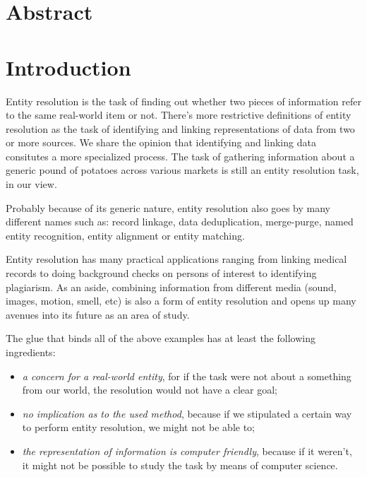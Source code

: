 \documentclass[11pt]{article}
\begin{document}
    \theoremstyle{definition}
    \newtheorem{defn}{Definition}[section]
    
    \section{Abstract}\label{sec:abstract}


    \section{Introduction}\label{sec:introduction}
    Entity resolution is the task of finding out whether two pieces of
    information refer to the same real-world item or not.
    There's more restrictive definitions of entity resolution as the task of
    identifying and linking representations of data from two or more
    sources\cite{Qia17}.
    We share the opinion that identifying and linking data consitutes a more
    specialized process\cite{Tal11}.
    The task of gathering information about a generic pound of potatoes across
    various markets is still an entity resolution task, in our view.
    
    Probably because of its generic nature, entity resolution also goes by many
    different names such as: record linkage, data deduplication, merge-purge,
    named entity recognition, entity alignment or entity
    matching\cite{Tal11,fever2009}.

    Entity resolution has many practical applications ranging from linking
    medical records to doing background checks on persons of interest to 
    identifying plagiarism.
    As an aside, combining information from different media (sound, images,
    motion, smell, etc) is also a form of entity resolution and opens up many
    avenues into its future as an area of study.

    The glue that binds all of the above examples has at least the following
    ingredients:
    \begin{itemize}
        \item\textit{a concern for a real-world entity}, for if the task were
        not about a something from our world, the resolution would not have a
        clear goal;
        \item\textit{no implication as to the used method}, because if we
        stipulated a certain way to perform entity resolution, we might not be
        able to;
        \item\textit{the representation of information is computer friendly},
        because if it weren't, it might not be possible to study the task by
        means of computer science.
    \end{itemize}
\end{document}
